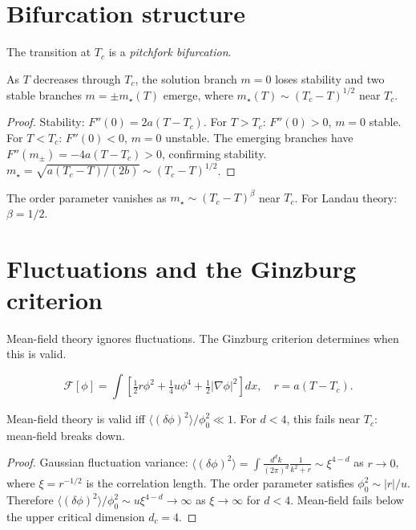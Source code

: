 \section{Bifurcation structure}

The transition at $T_c$ is a \emph{pitchfork bifurcation}.

\begin{proposition}
  \label{prop:pitchfork}
  \statusproven{}
  As $T$ decreases through $T_c$, the solution branch
  $m = 0$ loses stability and two stable branches
  $m = \pm m_\star(T)$ emerge, where
  $m_\star(T) \sim (T_c - T)^{1/2}$ near $T_c$.
\end{proposition}

\begin{proof}
  Stability: $F''(0) = 2a(T-T_c)$.
  For $T > T_c$: $F''(0) > 0$, $m=0$ stable.
  For $T < T_c$: $F''(0) < 0$, $m=0$ unstable.
  The emerging branches have $F''(m_\pm) = -4a(T-T_c) > 0$,
  confirming stability.
  $m_\star = \sqrt{a(T_c-T)/(2b)} \sim (T_c-T)^{1/2}$.
\end{proof}

\begin{definition}
  The order parameter vanishes as
  $m_\star \sim (T_c - T)^\beta$ near $T_c$.
  For Landau theory: $\beta = 1/2$.
\end{definition}

\section{Fluctuations and the Ginzburg criterion}

Mean-field theory ignores fluctuations.
The Ginzburg criterion determines when this is valid.

\begin{definition}
  \[
    \mathcal{F}[\phi]
    = \int\left[\tfrac{1}{2}r\phi^2 + \tfrac{1}{4}u\phi^4
      + \tfrac{1}{2}|\nabla\phi|^2\right]dx,
    \quad r = a(T - T_c).
  \]
\end{definition}

\begin{theorem}
  \label{thm:ginzburg}
  \statusproven{}
  Mean-field theory is valid iff
  $\langle(\delta\phi)^2\rangle / \phi_0^2 \ll 1$.
  For $d < 4$, this fails near $T_c$: mean-field breaks down.
\end{theorem}

\begin{proof}
  Gaussian fluctuation variance:
  $\langle(\delta\phi)^2\rangle
  = \int \frac{d^dk}{(2\pi)^d}\frac{1}{k^2+r}
  \sim \xi^{4-d}$ as $r \to 0$,
  where $\xi = r^{-1/2}$ is the correlation length.
  The order parameter satisfies $\phi_0^2 \sim |r|/u$.
  Therefore $\langle(\delta\phi)^2\rangle/\phi_0^2
  \sim u\xi^{4-d} \to \infty$ as $\xi \to \infty$ for $d < 4$.
  Mean-field fails below the upper critical dimension $d_c = 4$.
\end{proof}

